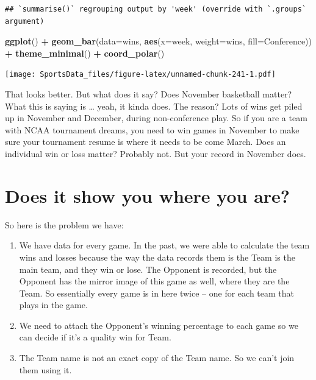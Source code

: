 \documentclass[
]{book}
\newenvironment{Shaded}{\begin{snugshade}}{\end{snugshade}}
\newcommand{\DataTypeTok}[1]{\textcolor[rgb]{0.13,0.29,0.53}{#1}}
\newcommand{\KeywordTok}[1]{\textcolor[rgb]{0.13,0.29,0.53}{\textbf{#1}}}
\newcommand{\NormalTok}[1]{#1}
\newcommand{\OperatorTok}[1]{\textcolor[rgb]{0.81,0.36,0.00}{\textbf{#1}}}
\newcommand{\StringTok}[1]{\textcolor[rgb]{0.31,0.60,0.02}{#1}}
\providecommand{\tightlist}{%
  \setlength{\itemsep}{0pt}\setlength{\parskip}{0pt}}
\begin{document}
\begin{verbatim}
## `summarise()` regrouping output by 'week' (override with `.groups` argument)
\end{verbatim}

\begin{Shaded}
\begin{Highlighting}[]
\KeywordTok{ggplot}\NormalTok{() }\OperatorTok{+}\StringTok{ }\KeywordTok{geom_bar}\NormalTok{(}\DataTypeTok{data=}\NormalTok{wins, }\KeywordTok{aes}\NormalTok{(}\DataTypeTok{x=}\NormalTok{week, }\DataTypeTok{weight=}\NormalTok{wins, }\DataTypeTok{fill=}\NormalTok{Conference)) }\OperatorTok{+}\StringTok{ }\KeywordTok{theme_minimal}\NormalTok{() }\OperatorTok{+}\StringTok{ }\KeywordTok{coord_polar}\NormalTok{()}
\end{Highlighting}
\end{Shaded}

\texttt{[image: SportsData\_files/figure-latex/unnamed-chunk-241-1.pdf]}

That looks better. But what does it say? Does November basketball matter? What this is saying is \ldots{} yeah, it kinda does. The reason? Lots of wins get piled up in November and December, during non-conference play. So if you are a team with NCAA tournament dreams, you need to win games in November to make sure your tournament resume is where it needs to be come March. Does an individual win or loss matter? Probably not. But your record in November does.

\hypertarget{does-it-show-you-where-you-are}{%
\section{Does it show you where you are?}\label{does-it-show-you-where-you-are}}

So here is the problem we have:

\begin{enumerate}
\def\labelenumi{\arabic{enumi}.}
\tightlist
\item
  We have data for every game. In the past, we were able to calculate the team wins and losses because the way the data records them is the Team is the main team, and they win or lose. The Opponent is recorded, but the Opponent has the mirror image of this game as well, where they are the Team. So essentially every game is in here twice -- one for each team that plays in the game.
\item
  We need to attach the Opponent's winning percentage to each game so we can decide if it's a quality win for Team.
\item
  The Team name is not an exact copy of the Team name. So we can't join them using it.
\end{enumerate}
\end{document}
